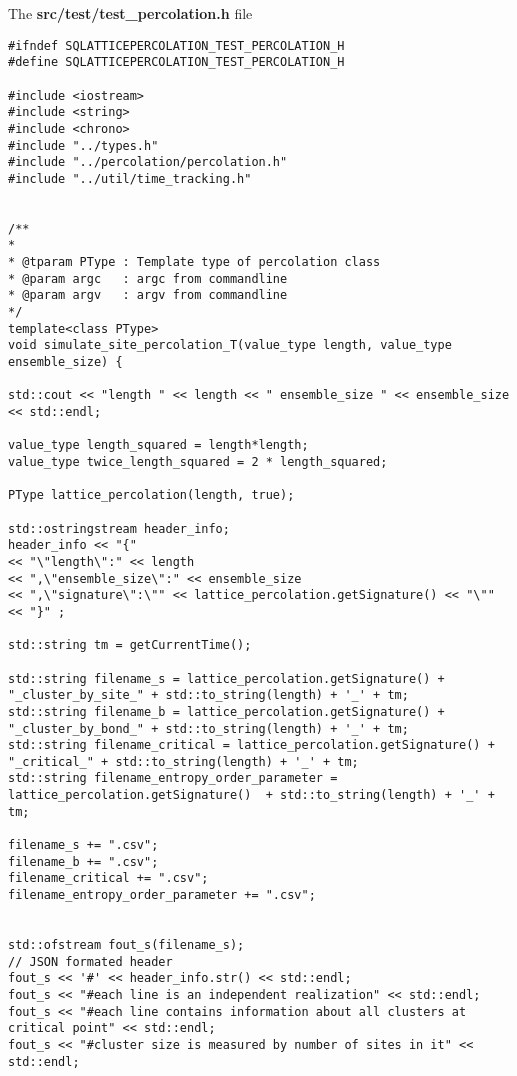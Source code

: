 

The \textbf{src/test/test_percolation.h} file

\begin{lstlisting}[style=CStyle]
#ifndef SQLATTICEPERCOLATION_TEST_PERCOLATION_H
#define SQLATTICEPERCOLATION_TEST_PERCOLATION_H

#include <iostream>
#include <string>
#include <chrono>
#include "../types.h"
#include "../percolation/percolation.h"
#include "../util/time_tracking.h"


/**
*
* @tparam PType : Template type of percolation class
* @param argc   : argc from commandline
* @param argv   : argv from commandline
*/
template<class PType>
void simulate_site_percolation_T(value_type length, value_type ensemble_size) {

std::cout << "length " << length << " ensemble_size " << ensemble_size << std::endl;

value_type length_squared = length*length;
value_type twice_length_squared = 2 * length_squared;

PType lattice_percolation(length, true);

std::ostringstream header_info;
header_info << "{"
<< "\"length\":" << length
<< ",\"ensemble_size\":" << ensemble_size
<< ",\"signature\":\"" << lattice_percolation.getSignature() << "\""
<< "}" ;

std::string tm = getCurrentTime();

std::string filename_s = lattice_percolation.getSignature() + "_cluster_by_site_" + std::to_string(length) + '_' + tm;
std::string filename_b = lattice_percolation.getSignature() + "_cluster_by_bond_" + std::to_string(length) + '_' + tm;
std::string filename_critical = lattice_percolation.getSignature() + "_critical_" + std::to_string(length) + '_' + tm;
std::string filename_entropy_order_parameter = lattice_percolation.getSignature()  + std::to_string(length) + '_' + tm;

filename_s += ".csv";
filename_b += ".csv";
filename_critical += ".csv";
filename_entropy_order_parameter += ".csv";


std::ofstream fout_s(filename_s);
// JSON formated header
fout_s << '#' << header_info.str() << std::endl;
fout_s << "#each line is an independent realization" << std::endl;
fout_s << "#each line contains information about all clusters at critical point" << std::endl;
fout_s << "#cluster size is measured by number of sites in it" << std::endl;


\end{lstlisting}
